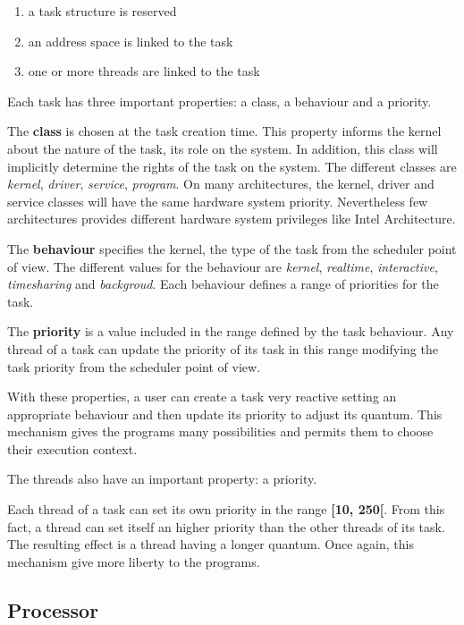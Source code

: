 \documentclass[10pt,a4wide]{article}
\begin{document}
\begin{multicols}{2}
\begin{enumerate}

\item a task structure is reserved
\item an address space is linked to the task
\item one or more threads are linked to the task

\end{enumerate}

Each task has three important properties: a class, a behaviour and a priority.

The \textbf{class} is chosen at the task creation time. This property
informs the kernel about the nature of the task, its role on the system.
In addition, this class will implicitly determine the rights of the task
on the system. The different classes are \textit{kernel}, \textit{driver},
\textit{service}, \textit{program}. On many architectures, the kernel, driver
and service classes will have the same hardware system priority.
Nevertheless few architectures provides different hardware system privileges
like Intel Architecture.

The \textbf{behaviour} specifies the kernel, the type of the task from the
scheduler point of view. The different values for the behaviour are
\textit{kernel}, \textit{realtime}, \textit{interactive}, \textit{timesharing}
and \textit{backgroud}. Each behaviour defines a range of priorities for the
task.

The \textbf{priority} is a value included in the range defined by the
task behaviour. Any thread of a task can update the priority of its
task in this range modifying the task priority from the scheduler
point of view.

With these properties, a user can create a task very reactive setting an
appropriate behaviour and then update its priority to adjust its quantum.
This mechanism gives the programs many possibilities and permits them to
choose their execution context.

The threads also have an important property: a priority.

Each thread of a task can set its own priority in the range \textbf{[10, 250[}.
From this fact, a thread can set itself an higher priority than the other
threads of its task. The resulting effect is a thread having a longer quantum.
Once again, this mechanism give more liberty to the programs.

\subsection{Processor}


\end{multicols}
\end{document}
